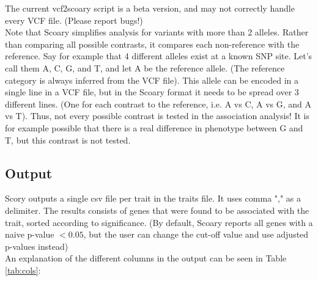 \documentclass{article}
\begin{document}
        The current vcf2scoary script is a beta version, and may not correctly handle every VCF file. (Please report bugs!) \\

        Note that Scoary simplifies analysis for variants with more than 2 alleles. Rather than comparing all possible contrasts, it compares each non-reference with the reference. Say for example that 4 different alleles exist at a known SNP site. Let's call them A, C, G, and T, and let A be the reference allele. (The reference category is always inferred from the VCF file). This allele can be encoded in a single line in a VCF file, but in the Scoary format it needs to be spread over 3 different lines. (One for each contrast to the reference, i.e. A vs C, A vs G, and A vs T). Thus, not every possible contrast is tested in the association analysis! It is for example possible that there is a real difference in phenotype between G and T, but this contrast is not tested.
    
    \subsection{Output}
      Scory outputs a single csv file per trait in the traits file. It uses comma "," as a delimiter. The results consists of genes that were found to be associated with the trait, sorted according to significance. (By default, Scoary reports all genes with a naive p-value $< 0.05$, but the user can change the cut-off value and use adjusted p-values instead) \\

      An explanation of the different columns in the output can be seen in Table \ref{tab:cols}: \\
      
\end{document}
